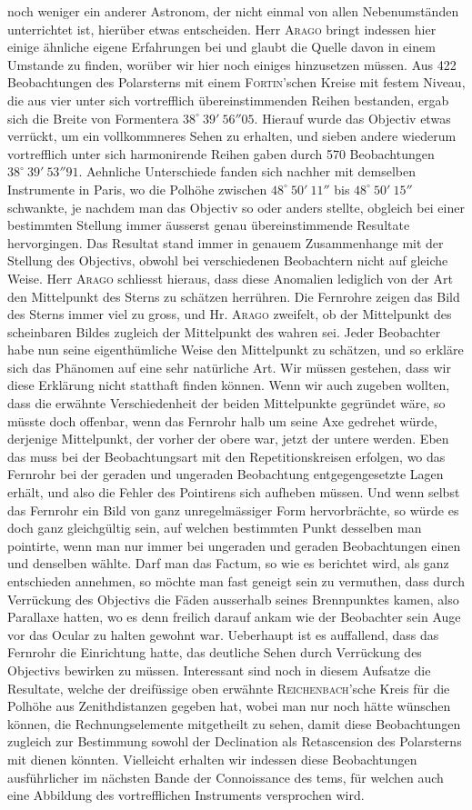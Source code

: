 \noindent noch weniger ein anderer Astronom, der nicht einmal von allen Nebenumständen unterrichtet ist, hierüber etwas entscheiden. Herr \textsc{Arago} bringt indessen hier einige ähnliche eigene Erfahrungen bei und glaubt die Quelle davon in einem Umstande zu finden, worüber wir hier noch einiges hinzusetzen müssen. Aus 422 Beobachtungen des Polarsterns mit einem \textsc{Fortin}'schen Kreise mit festem Niveau, die aus vier unter sich vortrefflich übereinstimmenden Reihen bestanden, ergab sich die Breite von Formentera $38^\circ\ 39'\ 56''05$. Hierauf wurde das Objectiv etwas verrückt, um ein vollkommneres Sehen zu erhalten, und sieben andere wiederum vortrefflich unter sich harmonirende Reihen gaben durch 570 Beobachtungen $38^\circ\ 39'\ 53''91$. Aehnliche Unterschiede fanden sich nachher mit demselben Instrumente in Paris, wo die Polhöhe zwischen $48^\circ\ 50'\ 11''$ bis $48^\circ\ 50'\ 15''$ schwankte, je nachdem man das Objectiv so oder anders stellte, obgleich bei einer bestimmten Stellung immer äusserst genau übereinstimmende Resultate hervorgingen. Das Resultat stand immer in genauem Zusammenhange mit der Stellung des Objectivs, obwohl bei verschiedenen Beobachtern nicht auf gleiche Weise. Herr \textsc{Arago} schliesst hieraus, dass diese Anomalien lediglich von der Art den Mittelpunkt des Sterns zu schätzen herrühren. Die Fernrohre zeigen das Bild des Sterns immer viel zu gross, und Hr. \textsc{Arago} zweifelt, ob der Mittelpunkt des scheinbaren Bildes zugleich der Mittelpunkt des wahren sei. Jeder Beobachter habe nun seine eigenthümliche Weise den Mittelpunkt zu schätzen, und so erkläre sich das Phänomen auf eine sehr natürliche Art. Wir müssen gestehen, dass wir diese Erklärung nicht statthaft finden können. Wenn wir auch zugeben wollten, dass die erwähnte Verschiedenheit der beiden Mittelpunkte gegründet wäre, so müsste doch offenbar, wenn das Fernrohr halb um seine Axe gedrehet würde, derjenige Mittelpunkt, der vorher der obere war, jetzt der untere werden. Eben das muss bei der Beobachtungsart mit den Repetitionskreisen erfolgen, wo das Fernrohr bei der geraden und ungeraden Beobachtung entgegengesetzte Lagen erhält, und also die Fehler des Pointirens sich aufheben müssen. Und wenn selbst das Fernrohr ein Bild von ganz unregelmässiger Form hervorbrächte, so würde es doch ganz gleichgültig sein, auf welchen bestimmten Punkt desselben man pointirte, wenn man nur immer bei ungeraden und geraden Beobachtungen einen und denselben wählte. Darf man das Factum, so wie es berichtet wird, als ganz entschieden annehmen, so möchte man fast geneigt sein zu vermuthen, dass durch Verrückung des Objectivs die Fäden ausserhalb seines Brennpunktes kamen, also Parallaxe hatten, wo es denn freilich darauf ankam wie der Beobachter sein Auge vor das Ocular zu halten gewohnt war. Ueberhaupt ist es auffallend, dass das Fernrohr die Einrichtung hatte, das deutliche Sehen durch Verrückung des Objectivs bewirken zu müssen. Interessant sind noch in diesem Aufsatze die Resultate, welche der dreifüssige oben erwähnte \textsc{Reichenbach}'sche Kreis für die Polhöhe aus Zenithdistanzen gegeben hat, wobei man nur noch hätte wünschen können, die Rechnungselemente mitgetheilt zu sehen, damit diese Beobachtungen zugleich zur Bestimmung sowohl der Declination als Retascension des Polarsterns mit dienen könnten. Vielleicht erhalten wir indessen diese Beobachtungen ausführlicher im nächsten Bande der Connoissance des tems, für welchen auch eine Abbildung des vortrefflichen Instruments versprochen wird.
\par\clearpage\endgroup
